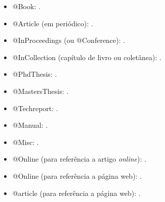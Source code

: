 \documentclass[english,notblind]{sbc20}
\begin{document}
\begin{itemize}
  \item @Book: \cite{Knuth:96}.

  \item @Article (em periódico): \cite{floats2014}.

  \item @InProceedings (ou @Conference): \cite{alves03:simi}.

  \item @InCollection (capítulo de livro ou coletânea): \cite{bobaoglu93:concepts}.

  \item @PhdThesis: \cite{garcia01:PhD}.

  \item @MastersThesis: \cite{schmidt03:MSc}.

  \item @Techreport: \cite{alvisi99:analysisCIC}.

  \item @Manual: \cite{biblatex}.

  \item @Misc: \cite{gridftp}.

  \item @Online (para referência a artigo \emph{online}): \cite{fowler04:designDead}.

  \item @Online (para referência a página web): \cite{FSF:GNU-GPL}.

  \item @article (para referência a página web): \cite{alon09:how}.
  
\end{itemize}


\end{document}
